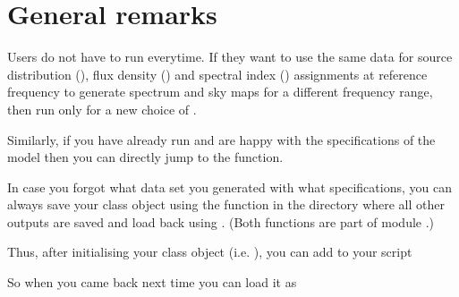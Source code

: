 \documentclass[letterpaper,10pt,english]{sphinxmanual}
\begin{document}
\sphinxstepscope


\chapter{General remarks}
\label{\detokenize{genrem:general-remarks}}\label{\detokenize{genrem::doc}}
\sphinxAtStartPar
Users do not have to run  everytime. If they want to use
the same data for source distribution (), flux density
() and spectral index () assignments
at reference frequency to generate spectrum and sky maps for a different
frequency range, then run only  for a new choice of
.

\sphinxAtStartPar
Similarly, if you have already run  and are happy with the
specifications of the model then you can directly jump to the
 function.

\sphinxAtStartPar
In case you forgot what data set you generated with what specifications,
you can always save your class object using the function
 in the directory where all
other outputs are saved and load back using . (Both
functions are part of module .)

\sphinxAtStartPar
Thus, after initialising your class object (i.e.
), you can add to your script

\begin{sphinxVerbatim}[commandchars=\\\{\}]
\end{sphinxVerbatim}

\sphinxAtStartPar
So when you came back next time you can load it as

\begin{sphinxVerbatim}[commandchars=\\\{\}]
\end{sphinxVerbatim}
\end{document}
